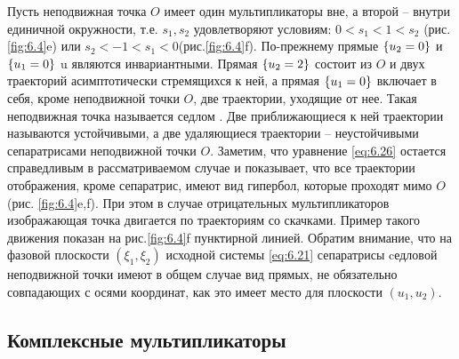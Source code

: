 Пусть неподвижная точка $O$ имеет один мультипликаторы вне, а второй --
внутри единичной окружности, т.е.
$s_1,s_2$ удовлетворяют условиям:
$0 < s_1 <1<s_2$
(рис. \ref{fig:6.4}e) или 
$s_2<-1<s_{1}<0$(рис.\ref{fig:6.4}f). По-прежнему прямые
$\qty{u_2=0}$ и $\qty{u_1=0}$ 
u являются инвариантными. Прямая $\qty{u_2=2}$ 
 состоит из $O$ и
двух траекторий асимптотически стремящихся к ней, а прямая 
$\qty{u_1=0}$
включает в себя, кроме неподвижной точки $O$, две траектории, уходящие от
нее. Такая неподвижная точка называется седлом . Две приближающиеся к ней
траектории называются устойчивыми, а две удаляющиеся траектории –
неустойчивыми сепаратрисами неподвижной точки $O$. Заметим, что уравнение
\eqref{eq:6.26} остается справедливым в рассматриваемом случае и показывает, что все
траектории отображения, кроме сепаратрис, имеют вид гипербол, которые
проходят мимо $O$ (рис. \ref{fig:6.4}e,f). При этом в случае отрицательных
мультипликаторов изображающая точка двигается по траекториям со скачками.
Пример такого движения показан на рис.\ref{fig:6.4}f  пунктирной линией. Обратим
внимание, что на фазовой плоскости
$(\xi_1,\xi_2)$
 исходной системы \eqref{eq:6.21}
сепаратрисы cедловой неподвижной точки имеют в общем случае вид прямых,
не обязательно совпадающих с осями координат, как это имеет место для
плоскости $(u_1,u_2)$. 

\subsection{Комплексные мультипликаторы}%

